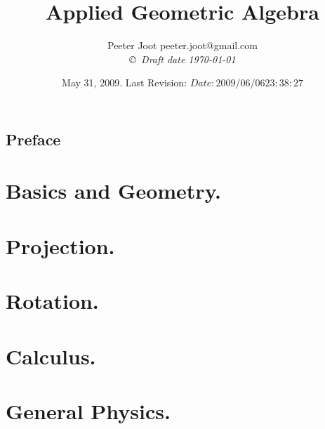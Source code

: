 \documentclass[12pt,leqno]{book}
\title{Applied Geometric Algebra}
\author{Peeter Joot  \quad peeter.joot@gmail.com \\
{\small\em \copyright \  Draft date \today }}
\date{ May 31, 2009.  Last Revision: $Date: 2009/06/06 23:38:27 $ }
\begin{document}
\maketitle
\tableofcontents
\listoffigures
\listoftables
\chapter*{Preface}\normalsize
\pagestyle{plain}


\pagestyle{headings}


\part{Basics and Geometry.}


















\part{Projection.}






\part{Rotation.}





\part{Calculus.}






\part{General Physics.}









\end{document}

